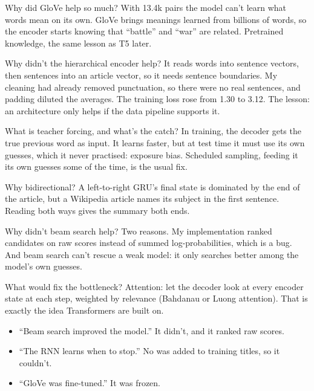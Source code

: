 \begin{iq}[\core]{Why did GloVe help so much?}
With 13.4k pairs the model can't learn what words mean on its own. GloVe brings meanings learned from billions of words, so the encoder starts knowing that ``battle'' and ``war'' are related. Pretrained knowledge, the same lesson as T5 later.
\end{iq}

\begin{iq}[\core]{Why didn't the hierarchical encoder help?}
It reads words into sentence vectors, then sentences into an article vector, so it needs sentence boundaries. My cleaning had already removed punctuation, so there were no real sentences, and padding diluted the averages. The training loss rose from 1.30 to 3.12. The lesson: an architecture only helps if the data pipeline supports it.
\end{iq}

\begin{iq}[\core]{What is teacher forcing, and what's the catch?}
In training, the decoder gets the true previous word as input. It learns faster, but at test time it must use its own guesses, which it never practised: exposure bias. Scheduled sampling, feeding it its own guesses some of the time, is the usual fix.
\end{iq}

\begin{iq}{Why bidirectional?}
A left-to-right GRU's final state is dominated by the end of the article, but a Wikipedia article names its subject in the first sentence. Reading both ways gives the summary both ends.
\end{iq}

\begin{iq}{Why didn't beam search help?}
Two reasons. My implementation ranked candidates on raw scores instead of summed log-probabilities, which is a bug. And beam search can't rescue a weak model: it only searches better among the model's own guesses.
\end{iq}

\begin{iq}{What would fix the bottleneck?}
Attention: let the decoder look at every encoder state at each step, weighted by relevance (Bahdanau or Luong attention). That is exactly the idea Transformers are built on.
\end{iq}

\begin{bugfix}
\begin{itemize}
  \item ``Beam search improved the model.'' It didn't, and it ranked raw scores.
  \item ``The RNN learns when to stop.'' No  was added to training titles, so it couldn't.
  \item ``GloVe was fine-tuned.'' It was frozen.
\end{itemize}
\end{bugfix}
